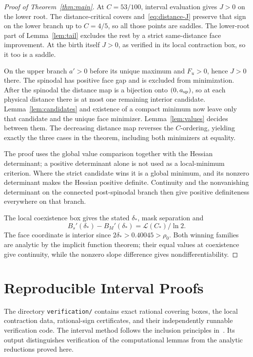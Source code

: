 \documentclass[12pt,letterpaper,onecolumn]{article}
\theoremstyle{definition}
\begin{document}
\begin{proof}[Proof of Theorem~\ref{thm:main}]
At \(C=53/100\), interval evaluation gives \(J>0\) on the lower root.
The distance-critical covers and~\eqref{eq:distance-J} preserve that sign on the lower branch up to \(C=4/5\), so all those points are saddles.
The lower-root part of Lemma~\ref{lem:tail} excludes the rest by a strict same-distance face improvement.
At the birth itself \(J>0\), as verified in its local contraction box, so it too is a saddle.

On the upper branch \(a'>0\) before its unique maximum and \(F_u>0\), hence \(J>0\) there.
The spinodal has positive face gap and is excluded from minimization.
After the spinodal the distance map is a bijection onto \((0,a_{\rm sp})\), so at each physical distance there is at most one remaining interior candidate.
Lemma~\ref{lem:candidates} and existence of a compact minimum now leave only that candidate and the unique face minimizer.
Lemma~\ref{lem:values} decides between them. The decreasing distance map reverses the \(C\)-ordering, yielding exactly the three cases in the theorem, including both minimizers at equality.

The proof uses the global value comparison together with the Hessian determinant; a positive determinant alone is not used as a local-minimum criterion.
Where the strict candidate wins it is a global minimum, and its nonzero determinant makes the Hessian positive definite.
Continuity and the nonvanishing determinant on the connected post-spinodal branch then give positive definiteness everywhere on that branch.

The local coexistence box gives the stated \(\delta_*\), mask separation and
\[
B_s'(\delta_*)-B_M'(\delta_*)=\mathcal L(C_*)/\ln2.
\]
The face coordinate is interior since \(2\delta_*>0.40045>\rho_0\).
Both winning families are analytic by the implicit function theorem; their equal values at coexistence give continuity, while the nonzero slope difference gives nondifferentiability.
\end{proof}

\section{Reproducible Interval Proofs}\label{sec:verification}
The directory \texttt{verification/} contains exact rational covering boxes, the local contraction data, rational-sign certificates, and their independently runnable verification code. The interval method follows the inclusion principles in~\cite{MooreKearfottCloud2009}. Its output distinguishes verification of the computational lemmas from the analytic reductions proved here.
\end{document}
